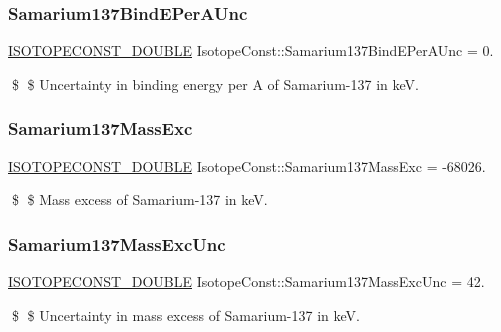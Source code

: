 \subsubsection{\texorpdfstring{Samarium137\+Bind\+E\+Per\+A\+Unc}{Samarium137BindEPerAUnc}}
{\footnotesize\ttfamily \mbox{\hyperlink{group___isotope_const-_macros_ga8f45a7272ce02c0b4c65c44636ed719a}{I\+S\+O\+T\+O\+P\+E\+C\+O\+N\+S\+T\+\_\+\+D\+O\+U\+B\+LE}} Isotope\+Const\+::\+Samarium137\+Bind\+E\+Per\+A\+Unc = 0.}

\$ \$ Uncertainty in binding energy per A of Samarium-\/137 in keV. \mbox{\label{group___isotope_const-_samarium-_sm137_gab5e0c97b8f53881e1b8244021bccb83c}} 
\subsubsection{\texorpdfstring{Samarium137\+Mass\+Exc}{Samarium137MassExc}}
{\footnotesize\ttfamily \mbox{\hyperlink{group___isotope_const-_macros_ga8f45a7272ce02c0b4c65c44636ed719a}{I\+S\+O\+T\+O\+P\+E\+C\+O\+N\+S\+T\+\_\+\+D\+O\+U\+B\+LE}} Isotope\+Const\+::\+Samarium137\+Mass\+Exc = -\/68026.}

\$ \$ Mass excess of Samarium-\/137 in keV. \mbox{\label{group___isotope_const-_samarium-_sm137_ga0bed463726ac9f4bbfcf89e27f4b64ba}} 
\subsubsection{\texorpdfstring{Samarium137\+Mass\+Exc\+Unc}{Samarium137MassExcUnc}}
{\footnotesize\ttfamily \mbox{\hyperlink{group___isotope_const-_macros_ga8f45a7272ce02c0b4c65c44636ed719a}{I\+S\+O\+T\+O\+P\+E\+C\+O\+N\+S\+T\+\_\+\+D\+O\+U\+B\+LE}} Isotope\+Const\+::\+Samarium137\+Mass\+Exc\+Unc = 42.}

\$ \$ Uncertainty in mass excess of Samarium-\/137 in keV. \mbox{\label{group___isotope_const-_samarium-_sm137_ga978cc3fc0595f3bb310b2b6665e14e20}} 

